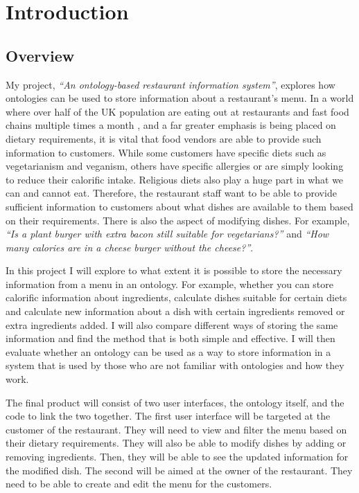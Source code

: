 \chapter{Introduction}

\section{Overview}

My project, \textit{``An ontology-based restaurant information system''}, explores how ontologies can be used to store information about a restaurant's menu. In a world where over half of the UK population are eating out at restaurants and fast food chains multiple times a month \cite{wunsch_2022}, and a far greater emphasis is being placed on dietary requirements, it is vital that food vendors are able to provide such information to customers. While some customers have specific diets such as vegetarianism and veganism, others have specific allergies or are simply looking to reduce their calorific intake. Religious diets also play a huge part in what we can and cannot eat. Therefore, the restaurant staff want to be able to provide sufficient information to customers about what dishes are available to them based on their requirements. There is also the aspect of modifying dishes. For example, \textit{``Is a plant burger with extra bacon still suitable for vegetarians?''} and \textit{``How many calories are in a cheese burger without the cheese?''}.

In this project I will explore to what extent it is possible to store the necessary information from a menu in an ontology. For example, whether you can store calorific information about ingredients, calculate dishes suitable for certain diets and calculate new information about a dish with certain ingredients removed or extra ingredients added.  I will also compare different ways of storing the same information and find the method that is both simple and effective. I will then evaluate whether an ontology can be used as a way to store information in a system that is used by those who are not familiar with ontologies and how they work.

The final product will consist of two user interfaces, the ontology itself, and the code to link the two together. The first user interface will be targeted at the customer of the restaurant. They will need to view and filter the menu based on their dietary requirements. They will also be able to modify dishes by adding or removing ingredients. Then, they will be able to see the updated information for the modified dish. The second will be aimed at the owner of the restaurant. They need to be able to create and edit the menu for the customers.

